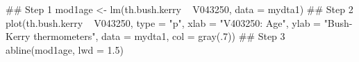 \begin{Schunk}
\begin{Sinput}
 ## Step 1
 mod1age <- lm(th.bush.kerry ~ V043250, data = mydta1)
 ## Step 2
 plot(th.bush.kerry ~ V043250, type = "p", xlab = "V403250: Age", ylab = "Bush-Kerry thermometers", data = mydta1, col = gray(.7))
 ## Step 3
 abline(mod1age, lwd = 1.5)
\end{Sinput}
\end{Schunk}
